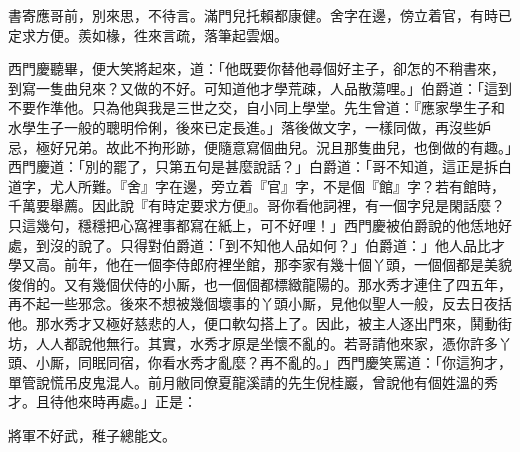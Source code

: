 \begin{myquote}
書寄應哥前，別來思，不待言。滿門兒托賴都康健。舍字在邊，傍立着官，有時已定求方便。羨如椽，徃來言疏，落筆起雲烟。
\end{myquote}

西門慶聽畢，便大笑將起來，道：「他既要你替他尋個好主子，卻怎的不稍書來，到寫一隻曲兒來？又做的不好。可知道他才學荒疎，人品散蕩哩。」伯爵道：「這到不要作準他。只為他與我是三世之交，自小同上學堂。先生曾道：『應家學生子和水學生子一般的聰明伶俐，後來已定長進。」落後做文字，一樣同做，再沒些妒忌，極好兄弟。故此不拘形跡，{}便隨意寫個曲兒。況且那隻曲兒，也倒做的有趣。」西門慶道：「別的罷了，只第五句是甚麼說話？」白爵道：「哥不知道，這正是拆白道字，尤人所難。『舍』字在邊，旁立着『官』字，不是個『館』字？若有館時，千萬要舉薦。因此說『有時定要求方便』。哥你看他詞裡，有一個字兒是閑話麼？只這幾句，穩穩把心窩裡事都寫在紙上，可不好哩！」西門慶被伯爵說的他恁地好處，到沒的說了。只得對伯爵道：「到不知他人品如何？」伯爵道：」他人品比才學又高。前年，他在一個李侍郎府裡坐館，那李家有幾十個丫頭，一個個都是美貌俊俏的。又有幾個伏侍的小厮，也一個個都標緻龍陽的。那水秀才連住了四五年，再不起一些邪念。後來不想被幾個壞事的丫頭小厮，見他似聖人一般，反去日夜括他。那水秀才又極好慈悲的人，便口軟勾搭上了。{}因此，被主人逐出門來，鬨動街坊，人人都說他無行。其實，水秀才原是坐懷不亂的。若哥請他來家，憑你許多丫頭、小厮，同眠同宿，你看水秀才亂麼？再不亂的。」西門慶笑罵道：「你這狗才，單管說慌吊皮鬼混人。前月敝同僚夏龍溪請的先生倪桂巖，曾說他有個姓溫的秀才。且待他來時再處。」正是：

\begin{myquote}
將軍不好武，稚子總能文。
\end{myquote}


